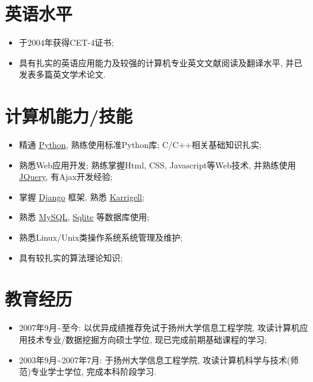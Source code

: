 \documentclass[a4paper,10pt,english]{manual}
\begin{document}
\section{英语水平}
\begin{itemize}
\item {} 
于2004年获得CET-4证书;

\item {} 
具有扎实的英语应用能力及较强的计算机专业英文文献阅读及翻译水平, 并已发表多篇英文学术论文.

\end{itemize}


\section{计算机能力/技能}
\begin{itemize}
\item {} 
精通 \href{http://www.python.org/}{Python}, 熟练使用标准Python库; C/C++相关基础知识扎实;

\item {} 
熟悉Web应用开发; 熟练掌握Html, CSS, Javascript等Web技术, 并熟练使用 \href{http://jquery.com}{JQuery}, 有Ajax开发经验;

\item {} 
掌握 \href{http://www.djangoproject.com/}{Django} 框架, 熟悉 \href{http://karrigell.sourceforge.net/}{Karrigell};

\item {} 
熟悉 \href{http://www.mysql.com}{MySQL}, \href{http://www.sqlite.org}{Sqlite} 等数据库使用;

\item {} 
熟悉Linux/Unix类操作系统系统管理及维护;

\item {} 
具有较扎实的算法理论知识;

\end{itemize}


\section{教育经历}
\begin{itemize}
\item {} 
2007年9月\textasciitilde{}至今: 以优异成绩推荐免试于扬州大学信息工程学院, 攻读计算机应用技术专业/数据挖掘方向硕士学位, 现已完成前期基础课程的学习;

\item {} 
2003年9月\textasciitilde{}2007年7月: 于扬州大学信息工程学院, 攻读计算机科学与技术(师范)专业学士学位, 完成本科阶段学习.

\end{itemize}
\end{document}
